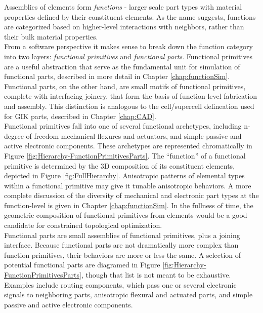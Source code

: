 {Assemblies of elements form \textit{functions} - larger scale part types with material properties defined by their constituent elements.  As the name suggests, functions are categorized based on higher-level interactions with neighbors, rather than their bulk material properties.\\

From a software perspective it makes sense to break down the function category into two layers: \textit{functional primitives} and \textit{functional parts}.  Functional primitives are a useful abstraction that serve as the fundamental unit for simulation of functional parts, described in more detail in Chapter \ref{chap:functionSim}.  Functional parts, on the other hand, are small motifs of functional primitives, complete with interfacing joinery, that form the basis of function-level fabrication and assembly.  This distinction is analogous to the cell/supercell delineation used for GIK parts, described in Chapter \ref{chap:CAD}.\\

Functional primitives fall into one of several functional archetypes, including n-degree-of-freedom mechanical flexures and actuators, and simple passive and active electronic components.  These archetypes are represented chromatically in Figure \ref{fig:Hierarchy-FunctionPrimitivesParts}.  The ``function'' of a functional primitive is determined by the 3D composition of its constituent elements, depicted in Figure \ref{fig:FullHierarchy}.  Anisotropic patterns of elemental types within a functional primitive may give it tunable anisotropic behaviors.  A more complete discussion of the diversity of mechanical and electronic part types at the function-level is given in Chapter \ref{chap:functionSim}.  In the fullness of time, the geometric composition of functional primitives from elements would be a good candidate for constrained topological optimization.\\

Functional parts are small assemblies of functional primitives, plus a joining interface.  Because functional parts are not dramatically more complex than function primitives, their behaviors are more or less the same.  A selection of potential functional parts are diagramed in Figure \ref{fig:Hierarchy-FunctionPrimitivesParts}, though that list is not meant to be exhaustive.  Examples include routing components, which pass one or several electronic signals to neighboring parts, anisotropic flexural and actuated parts, and simple passive and active electronic components.\\

}
